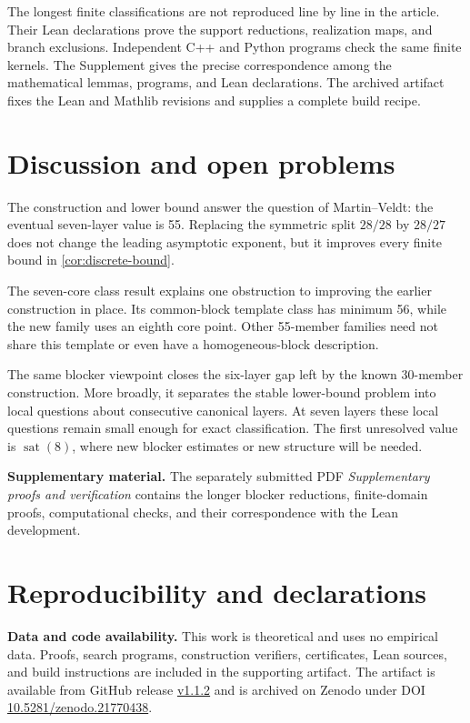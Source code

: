 \documentclass[11pt]{article}
\theoremstyle{definition}
\theoremstyle{remark}
\newcommand{\sat}{\operatorname{sat}}
\begin{document}
The longest finite classifications are not reproduced line by line in the
article.  Their Lean declarations prove the support reductions, realization
maps, and branch exclusions.  Independent C++ and Python programs check the
same finite kernels.  The Supplement gives the precise correspondence among
the mathematical lemmas, programs, and Lean declarations.  The archived
artifact fixes the Lean and Mathlib revisions and supplies a complete build
recipe.

\section{Discussion and open problems}

The construction and lower bound answer the question of Martin--Veldt: the
eventual seven-layer value is 55.  Replacing the symmetric split $28/28$ by
$28/27$ does not change the leading asymptotic exponent, but it improves every
finite bound in \cref{cor:discrete-bound}.

The seven-core class result explains one obstruction to improving the earlier
construction in place.  Its common-block template class has minimum 56, while
the new family uses an eighth core point.  Other 55-member families need not
share this template or even have a homogeneous-block description.

The same blocker viewpoint closes the six-layer gap left by the known
30-member construction.  More broadly, it separates the stable lower-bound
problem into local questions about consecutive canonical layers.  At seven
layers these local questions remain small enough for exact classification.
The first unresolved value is $\sat(8)$, where new blocker estimates or new
structure will be needed.

\par\medskip\noindent\textbf{Supplementary material.}\quad
The separately submitted PDF \emph{Supplementary proofs and verification}
contains the longer blocker reductions, finite-domain proofs, computational
checks, and their correspondence with the Lean development.

\section*{Reproducibility and declarations}

\par\medskip\noindent\textbf{Data and code availability.}\quad
This work is theoretical and uses no empirical data.  Proofs, search programs,
construction verifiers, certificates, Lean sources, and build instructions
are included in the supporting artifact.  The artifact is available from
GitHub release
\href{https://github.com/lailai0916/saturated-sperner-6-7/releases/tag/v1.1.2}
{v1.1.2} and is archived on Zenodo under DOI
\href{https://doi.org/10.5281/zenodo.21770438}{10.5281/zenodo.21770438}.
\end{document}

